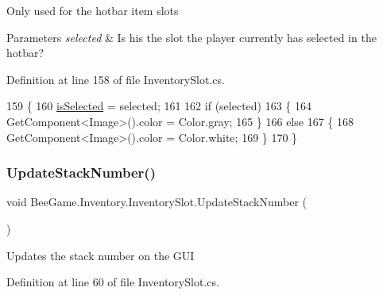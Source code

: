 Only used for the hotbar item slots 


\begin{DoxyParams}{Parameters}
{\em selected} & Is his the slot the player currently has selected in the hotbar?\\
\hline
\end{DoxyParams}


Definition at line 158 of file Inventory\+Slot.\+cs.


\begin{DoxyCode}
159         \{
160             \hyperlink{class_bee_game_1_1_inventory_1_1_inventory_slot_a3c2a56594821f0567448a541b1236961}{isSelected} = selected;
161 
162             \textcolor{keywordflow}{if} (selected)
163             \{
164                 GetComponent<Image>().color = Color.gray;
165             \}
166             \textcolor{keywordflow}{else}
167             \{
168                 GetComponent<Image>().color = Color.white;
169             \}
170         \}
\end{DoxyCode}
\mbox{\label{class_bee_game_1_1_inventory_1_1_inventory_slot_a58cc9b63c6af1dceccee17210b73f70d}} 
\subsubsection{\texorpdfstring{Update\+Stack\+Number()}{UpdateStackNumber()}}
{\footnotesize\ttfamily void Bee\+Game.\+Inventory.\+Inventory\+Slot.\+Update\+Stack\+Number (\begin{DoxyParamCaption}{ }\end{DoxyParamCaption})\hspace{0.3cm}{\ttfamily [private]}}



Updates the stack number on the G\+UI 



Definition at line 60 of file Inventory\+Slot.\+cs.



